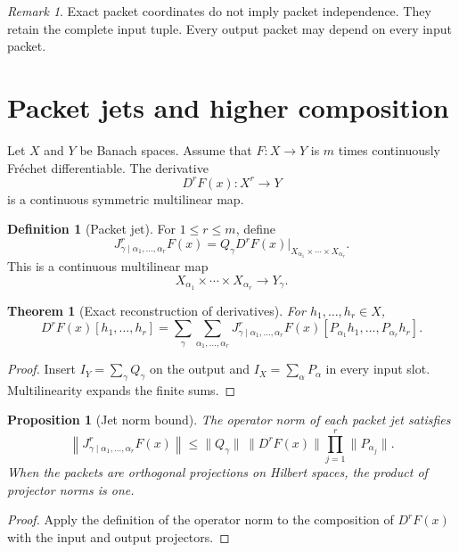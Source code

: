 \documentclass{aomart}
\newtheorem{theorem}{Theorem}[section]
\newtheorem{proposition}[proposition]{Proposition}
\theoremstyle{definition}
\newtheorem{definition}[definition]{Definition}
\theoremstyle{remark}
\newtheorem{remark}[remark]{Remark}
\begin{document}
\begin{remark}\label{rem:coordinates_not_independence}
Exact packet coordinates do not imply packet independence.  They retain the complete input tuple.  Every output packet may depend on every input packet.
\end{remark}

\section{Packet jets and higher composition}\label{sec:packet_jets}

Let $X$ and $Y$ be Banach spaces.  Assume that $F:X\to Y$ is $m$ times continuously Fr\'echet differentiable.  The derivative
\[
D^rF(x):X^r\longrightarrow Y
\]
is a continuous symmetric multilinear map.

\begin{definition}[Packet jet]\label{def:packet_jet}
For $1\le r\le m$, define
\[
J^{r}_{\gamma\mid\alpha_1,\ldots,\alpha_r}F(x)
=
Q_\gamma D^rF(x)
\big|_{X_{\alpha_1}\times\cdots\times X_{\alpha_r}}.
\]
This is a continuous multilinear map
\[
X_{\alpha_1}\times\cdots\times X_{\alpha_r}
\longrightarrow
Y_\gamma.
\]
\end{definition}

\begin{theorem}[Exact reconstruction of derivatives]\label{thm:jet_reconstruction}
For $h_1,\ldots,h_r\in X$,
\[
D^rF(x)[h_1,\ldots,h_r]
=
\sum_{\gamma}
\sum_{\alpha_1,\ldots,\alpha_r}
J^{r}_{\gamma\mid\alpha_1,\ldots,\alpha_r}F(x)
[P_{\alpha_1}h_1,\ldots,P_{\alpha_r}h_r].
\]
\end{theorem}

\begin{proof}
Insert $I_Y=\sum_\gamma Q_\gamma$ on the output and $I_X=\sum_\alpha P_\alpha$ in every input slot.  Multilinearity expands the finite sums.
\end{proof}

\begin{proposition}[Jet norm bound]\label{prop:jet_norm_bound}
The operator norm of each packet jet satisfies
\[
\left\|J^{r}_{\gamma\mid\alpha_1,\ldots,\alpha_r}F(x)\right\|
\le
\|Q_\gamma\|\,\|D^rF(x)\|
\prod_{j=1}^r\|P_{\alpha_j}\|.
\]
When the packets are orthogonal projections on Hilbert spaces, the product of projector norms is one.
\end{proposition}

\begin{proof}
Apply the definition of the operator norm to the composition of $D^rF(x)$ with the input and output projectors.
\end{proof}
\end{document}
